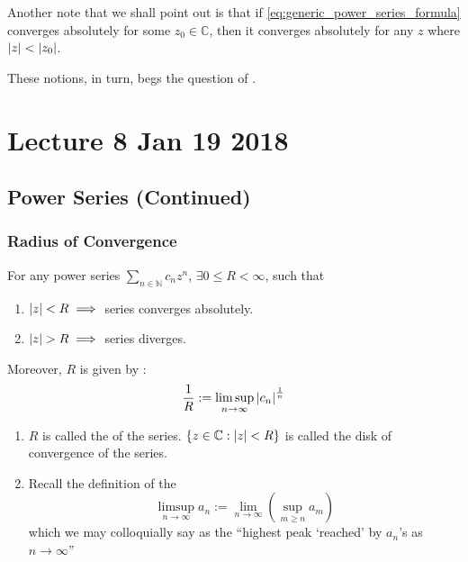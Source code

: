 \documentclass[11pt, oneside]{book}
\begin{document}
Another note that we shall point out is that if \cref{eq:generic_power_series_formula} converges absolutely for some $z_0 \in \mathbb{C}$, then it converges absolutely for any $z$ where $\left|z\right| < \left|z_0\right|$.

These notions, in turn, begs the question of .




\chapter{Lecture 8 Jan 19 2018}
	\label{chapter:lecture_8_jan_19_2018}

\section{Power Series (Continued)} %
\label{sec:power_series_continued}

\subsection{Radius of Convergence} %
\label{sub:radius_of_convergence}

\begin{thm}\label{thm:convergence_in_the_radius_of_convergence}
	For any power series $\sum_{n \in \mathbb{N}} c_n z^n$, $\exists 0 \leq R < \infty$, such that
	\begin{enumerate}
		\item $\left|z\right| < R \implies $ series converges absolutely.
		\item $\left|z\right| > R \implies $ series diverges.
	\end{enumerate}
	Moreover, $R$ is given by :
	\begin{equation}\label{eq:hadamards_formula}
		\frac{1}{R} := \limsup_{n \to \infty} \left|c_n\right|^\frac{1}{n}
	\end{equation}
\end{thm}

\begin{remark}
	\begin{enumerate}
		\item $R$ is called the  of the series. $\{z \in \mathbb{C} : \left|z\right| < R\}$ is called the disk of convergence of the series.
		\item Recall the definition of the 
		\begin{equation}
			\label{eq:defn_limsup}
			\limsup_{n \to \infty} a_n := \lim_{n \to \infty} (\sup_{m \geq n} a_m)
		\end{equation}
		which we may colloquially say as the ``highest peak `reached' by $a_n$'s as $n \to \infty$''
	\end{enumerate}
\end{remark}
\end{document}
